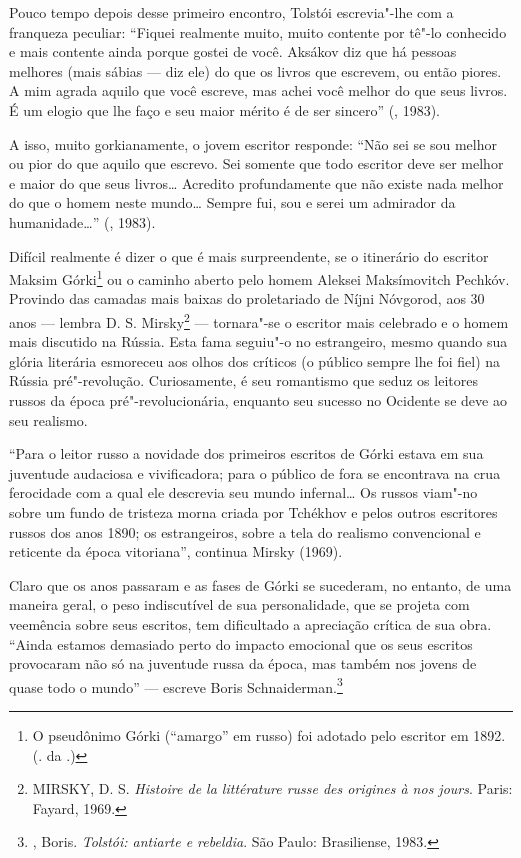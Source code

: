Pouco tempo depois desse primeiro encontro, Tolstói escrevia"-lhe
com a franqueza peculiar: ``Fiquei realmente muito, muito contente
por tê"-lo conhecido e mais contente ainda porque gostei de você.
Aksákov diz que há pessoas melhores (mais sábias --- diz ele) do
que os livros que escrevem, ou então piores. A mim agrada aquilo
que você escreve, mas achei você melhor do que seus livros. É um
elogio que lhe faço e seu maior mérito é de ser sincero''
(, 1983).

A isso, muito gorkianamente, o jovem escritor responde: ``Não sei
se sou melhor ou pior do que aquilo que escrevo. Sei somente que
todo escritor deve ser melhor e maior do que seus livros\ldots{}
Acredito profundamente que não existe nada melhor do que o homem
neste mundo\ldots{} Sempre fui, sou e serei um admirador da
humanidade\ldots{}'' (, 1983).

Difícil realmente é dizer o que é mais surpreendente, se o
itinerário do escritor Maksim Górki\footnote{O pseudônimo Górki
(``amargo'' em russo) foi adotado pelo escritor em 1892.
(. da .)} ou o caminho aberto pelo homem Aleksei
Maksímovitch Pechkóv. Provindo das camadas mais baixas do
proletariado de Níjni Nóvgorod, aos 30 anos --- lembra D. S.
Mirsky\footnote{\scalebox{0.8} {MIRSKY}, D. S. \emph{Histoire de la
littérature russe des origines à nos jours}. Paris: Fayard,
1969.} --- tornara"-se o escritor mais celebrado e o homem mais
discutido na Rússia. Esta fama seguiu"-o no estrangeiro, mesmo
quando sua glória literária esmoreceu aos olhos dos críticos (o
público sempre lhe foi fiel) na Rússia pré"-revolução. Curiosamente,
é seu romantismo que seduz os leitores russos da época pré"-revolucionária,
enquanto seu sucesso no Ocidente se deve ao seu realismo.

``Para o leitor russo a novidade dos primeiros escritos de Górki
estava em sua juventude audaciosa e vivificadora; para o público
de fora se encontrava na crua ferocidade com a qual ele descrevia
seu mundo infernal\ldots{} Os russos viam"-no sobre um fundo de
tristeza morna criada por Tchékhov e pelos outros escritores
russos dos anos 1890; os estrangeiros, sobre a tela do realismo
convencional e reticente da época vitoriana'', continua Mirsky
(1969).

Claro que os anos passaram e as fases de Górki se sucederam, no
entanto, de uma maneira geral, o peso indiscutível de sua
personalidade, que se projeta com veemência sobre seus escritos,
tem dificultado a apreciação crítica de sua obra. ``Ainda estamos
demasiado perto do impacto emocional que os seus escritos provocaram
não só na juventude russa da época, mas também nos jovens de quase
todo o mundo'' --- escreve Boris Schnaiderman.\footnote{,
Boris. \emph{Tolstói: antiarte e rebeldia}. São Paulo:
Brasiliense, 1983.}

